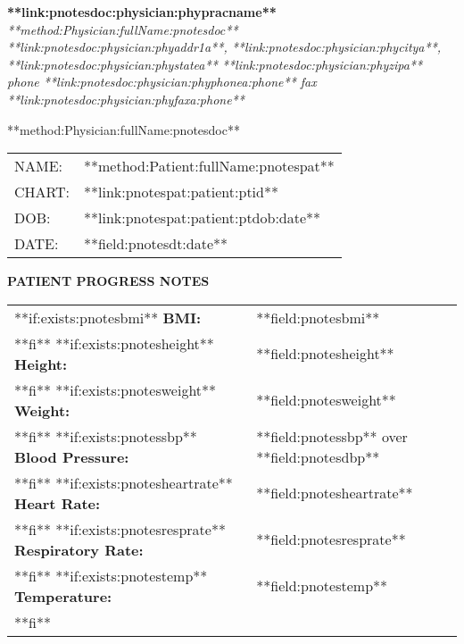 \documentclass{article}
\newcommand{\sheading}[1]{\textbf{#1:}}
\begin{document}
\begin{center}
        {\textbf{**link:pnotesdoc:physician:phypracname**}} \\
        {\textsl{**method:Physician:fullName:pnotesdoc**}} \\
        \textsl{**link:pnotesdoc:physician:phyaddr1a**, **link:pnotesdoc:physician:phycitya**, **link:pnotesdoc:physician:phystatea** **link:pnotesdoc:physician:phyzipa** } \\
        \textsl{phone **link:pnotesdoc:physician:phyphonea:phone** fax **link:pnotesdoc:physician:phyfaxa:phone**}
\end{center}

**method:Physician:fullName:pnotesdoc** \\
\begin{tabular}{ll}
	NAME:	&	**method:Patient:fullName:pnotespat**	\\
	CHART:	&	**link:pnotespat:patient:ptid** 	\\
	DOB:	&	**link:pnotespat:patient:ptdob:date**	\\
	DATE:	&	**field:pnotesdt:date**
\end{tabular}

\begin{center}
	{\textbf{PATIENT PROGRESS NOTES}}
\end{center}

\begin{tabular}{ll}
**if:exists:pnotesbmi**
\sheading{BMI} & **field:pnotesbmi** \\
**fi**
**if:exists:pnotesheight**
\sheading{Height} & **field:pnotesheight** \\
**fi**
**if:exists:pnotesweight**
\sheading{Weight} & **field:pnotesweight** \\
**fi**
**if:exists:pnotessbp**
\sheading{Blood Pressure} & **field:pnotessbp** over **field:pnotesdbp** \\
**fi**
**if:exists:pnotesheartrate**
\sheading{Heart Rate} & **field:pnotesheartrate** \\
**fi**
**if:exists:pnotesresprate**
\sheading{Respiratory Rate} & **field:pnotesresprate** \\
**fi**
**if:exists:pnotestemp**
\sheading{Temperature} & **field:pnotestemp** \\
**fi**
\  &  \  
\end{tabular} \\
\par
\end{document}
